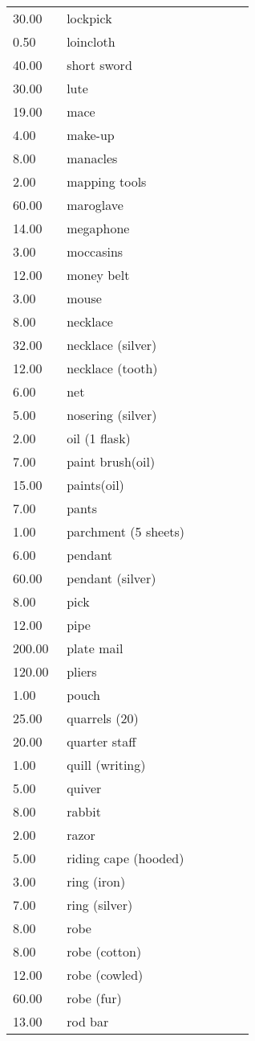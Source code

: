 \begin{tcolorbox}[breakable,boxrule=0pt,title=\textbf{Equipment Costs}]
\begin{xtabular}{@{}p{0.2\linewidth} p{0.7\linewidth}}
30.00 & lockpick\\
0.50 & loincloth\\
40.00 & short sword\\
30.00 & lute\\
19.00 & mace\\
4.00 & make-up\\
8.00 & manacles\\
2.00 & mapping tools\\
60.00 & maroglave\\
14.00 & megaphone\\
3.00 & moccasins\\
12.00 & money belt\\
3.00 & mouse\\
8.00 & necklace\\
32.00 & necklace (silver)\\
12.00 & necklace (tooth)\\
6.00 & net\\
5.00 & nosering (silver)\\
2.00 & oil (1 flask)\\
7.00 & paint brush(oil)\\
15.00 & paints(oil)\\
7.00 & pants\\
1.00 & parchment (5 sheets)\\
6.00 & pendant\\
60.00 & pendant (silver)\\
8.00 & pick\\
12.00 & pipe\\
200.00 & plate mail\\
120.00 & pliers\\
1.00 & pouch\\
25.00 & quarrels (20)\\
20.00 & quarter staff\\
1.00 & quill (writing)\\
5.00 & quiver\\
8.00 & rabbit\\
2.00 & razor\\
5.00 & riding cape (hooded)\\
3.00 & ring (iron)\\
7.00 & ring (silver)\\
8.00 & robe\\
8.00 & robe (cotton)\\
12.00 & robe (cowled)\\
60.00 & robe (fur)\\
13.00 & rod bar\\

\end{xtabular}
\end{tcolorbox}

